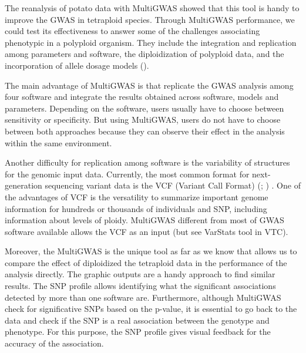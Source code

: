\documentclass{article}
\begin{document}

The reanalysis of potato data with MultiGWAS showed that this tool is handy to improve the GWAS in tetraploid species. Through MultiGWAS performance, we could test its effectiveness to answer some of the challenges associating phenotypic in a polyploid organism. They include the integration and replication among parameters and software, the diploidization of polyploid data, and the incorporation of allele dosage models (\cite{dufresne2014}). 

The main advantage of MultiGWAS is that replicate the GWAS analysis among four software and integrate the results obtained across software, models and parameters. Depending on the software, users usually have to choose between sensitivity or specificity. But using MultiGWAS, users do not have to choose between both approaches because they can observe their effect in the analysis within the same environment.  

Another difficulty for replication among software is the variability of structures for the genomic input data. Currently, the most common format for next-generation sequencing variant data is the VCF (Variant Call Format) (\cite{Danecek2011}; \cite{Ebbert2014}) . One of the advantages of VCF is the versatility to summarize important genome information for hundreds or thousands of individuals and SNP, including information about levels of ploidy. MultiGWAS different from most of GWAS software available allows the VCF as an input (but see VarStats tool in VTC).  

Moreover, the MultiGWAS is the unique tool as far as we know that allows us to compare the effect of diploidized the tetraploid data in the performance of the analysis directly. The graphic outputs are a handy approach to find similar results. The SNP profile allows identifying what the significant associations detected by more than one software are. Furthermore, although MultiGWAS check for significative SNPs based on the p-value, it is essential to go back to the data and check if the SNP is a real association between the genotype and phenotype. For this purpose, the SNP profile gives visual feedback for the accuracy of the association.
\end{document}
